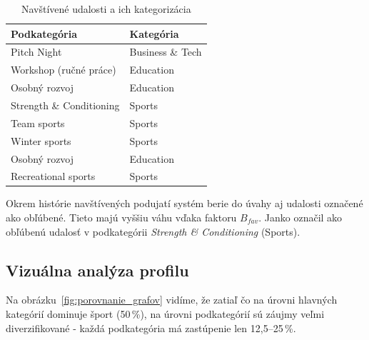\documentclass[12pt,a4paper]{article}
\begin{document}
\begin{table}[H]
\centering
\caption{Navštívené udalosti a ich kategorizácia}
\label{tab:konkretne_eventy}
\small
\begin{tabular}{|l|l|}
\hline
\textbf{Podkategória}    & \textbf{Kategória} \\ \hline
Pitch Night              & Business \& Tech \\
Workshop (ručné práce)   & Education \\
Osobný rozvoj            & Education \\
Strength \& Conditioning & Sports \\
Team sports              & Sports \\
Winter sports            & Sports \\
Osobný rozvoj            & Education \\
Recreational sports      & Sports \\ \hline
\end{tabular}
\end{table}

Okrem histórie navštívených podujatí systém berie do úvahy aj udalosti označené
ako obľúbené. Tieto majú vyššiu váhu vďaka faktoru $B_{fav}$. Janko označil ako
obľúbenú udalosť v podkategórii \textit{Strength \& Conditioning} (Sports).

\subsection{Vizuálna analýza profilu}

Na obrázku~\ref{fig:porovnanie_grafov} vidíme, že zatiaľ čo na úrovni hlavných
kategórií dominuje šport (50\,\%), na úrovni podkategórií sú záujmy veľmi
diverzifikované - každá podkategória má zastúpenie len 12,5–25\,\%.
\end{document}

